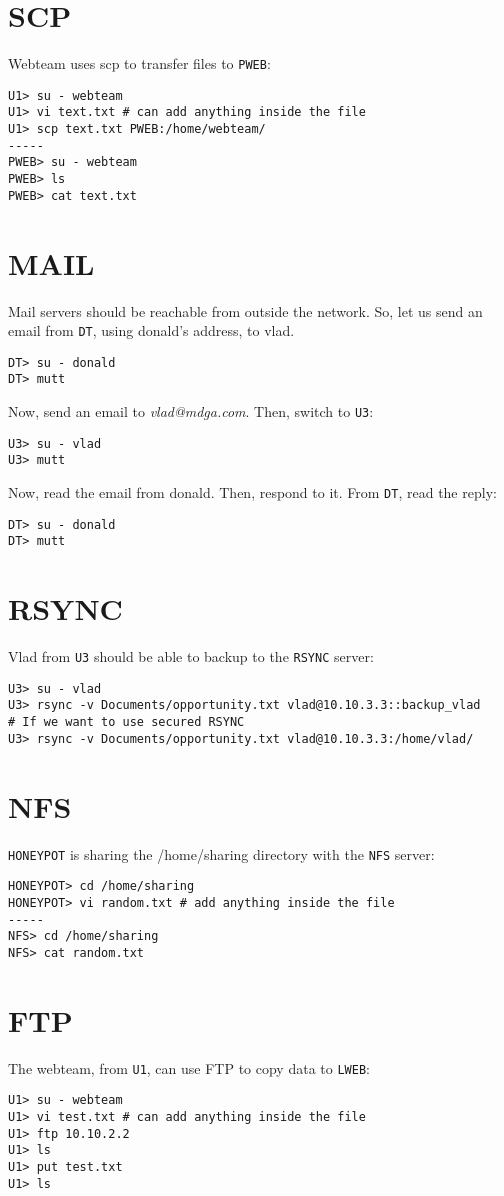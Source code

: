 \documentclass[a4paper, 11pt, oneside]{article}
\begin{document}
\section{SCP}
\noindent Webteam uses scp to transfer files to \texttt{PWEB}:
\begin{lstlisting}
U1> su - webteam
U1> vi text.txt # can add anything inside the file
U1> scp text.txt PWEB:/home/webteam/
-----
PWEB> su - webteam
PWEB> ls
PWEB> cat text.txt
\end{lstlisting}

\section{MAIL}
\noindent Mail servers should be reachable from outside the network. So, let us send an email from \texttt{DT}, using donald's address, to vlad.
\begin{lstlisting}
DT> su - donald
DT> mutt
\end{lstlisting}
Now, send an email to \textit{vlad@mdga.com}. Then, switch to \texttt{U3}:
\begin{lstlisting}
U3> su - vlad
U3> mutt
\end{lstlisting}
Now, read the email from donald. Then, respond to it. From \texttt{DT}, read the reply:
\begin{lstlisting}
DT> su - donald
DT> mutt
\end{lstlisting}

\section{RSYNC}
\noindent Vlad from \texttt{U3} should be able to backup to the \texttt{RSYNC} server:
\begin{lstlisting}
U3> su - vlad
U3> rsync -v Documents/opportunity.txt vlad@10.10.3.3::backup_vlad
# If we want to use secured RSYNC
U3> rsync -v Documents/opportunity.txt vlad@10.10.3.3:/home/vlad/
\end{lstlisting}

\section{NFS}
\noindent \texttt{HONEYPOT} is sharing the /home/sharing directory with the \texttt{NFS} server:
\begin{lstlisting}
HONEYPOT> cd /home/sharing
HONEYPOT> vi random.txt # add anything inside the file
-----
NFS> cd /home/sharing
NFS> cat random.txt
\end{lstlisting}

\section{FTP}
\noindent The webteam, from \texttt{U1}, can use FTP to copy data to \texttt{LWEB}:
\begin{lstlisting}
U1> su - webteam
U1> vi test.txt # can add anything inside the file
U1> ftp 10.10.2.2
U1> ls
U1> put test.txt
U1> ls
\end{lstlisting}
\end{document}
